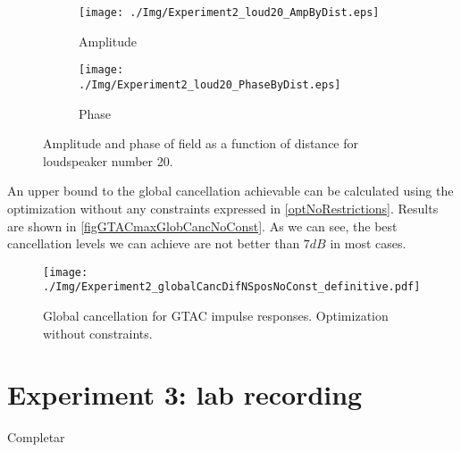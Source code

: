 \begin{figure}
	\begin{subfigure}[b]{0.49\textwidth}
		\centering
		\texttt{[image: ./Img/Experiment2\_loud20\_AmpByDist.eps]}
		\caption{Amplitude}
	\end{subfigure}
	\begin{subfigure}[b]{0.49\textwidth}
		\centering
		\texttt{[image: ./Img/Experiment2\_loud20\_PhaseByDist.eps]}
		\caption{Phase}
	\end{subfigure}
	\caption{Amplitude and phase of field as a function of distance for loudspeaker number 20.}
	\label{figGTAClouds20Comparison}
\end{figure}

An upper bound to the global cancellation achievable can be calculated using the optimization without any constraints expressed in \autoref{optNoRestrictions}. Results are shown in \autoref{figGTACmaxGlobCancNoConst}. As we can see, the best cancellation levels we can achieve are not better than $7\si{dB}$ in most cases.

\begin{figure}
	\centering
	\texttt{[image: ./Img/Experiment2\_globalCancDifNSposNoConst\_definitive.pdf]}
	\caption{Global cancellation for GTAC impulse responses. Optimization without constraints.}
	\label{figGTACmaxGlobCancNoConst}
\end{figure}

\section{Experiment 3: lab recording}
Completar
